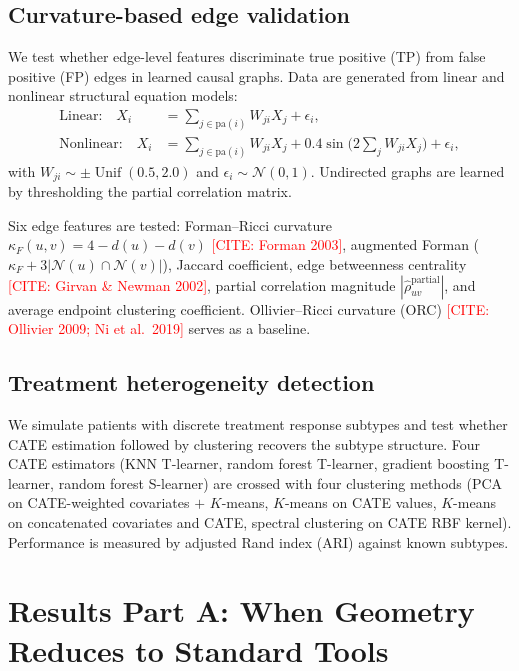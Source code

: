 \documentclass[11pt]{article}
\newcommand{\misscite}[1]{\textcolor{red}{[CITE: #1]}}
\begin{document}
\subsection{Curvature-based edge validation}
\label{sec:meth-curvature}

We test whether edge-level features discriminate true positive (TP) from false positive (FP) edges in learned causal graphs.
Data are generated from linear and nonlinear structural equation models:
\begin{align}
    \text{Linear:} \quad X_i &= \textstyle\sum_{j \in \mathrm{pa}(i)} W_{ji} X_j + \epsilon_i, \\
    \text{Nonlinear:} \quad X_i &= \textstyle\sum_{j \in \mathrm{pa}(i)} W_{ji} X_j + 0.4 \sin\!\bigl(2 \textstyle\sum_{j} W_{ji} X_j\bigr) + \epsilon_i,
\end{align}
with $W_{ji} \sim \pm\operatorname{Unif}(0.5, 2.0)$ and $\epsilon_i \sim \mathcal{N}(0, 1)$.
Undirected graphs are learned by thresholding the partial correlation matrix.

Six edge features are tested:
Forman--Ricci curvature $\kappa_F(u,v) = 4 - d(u) - d(v)$ \misscite{Forman 2003},
augmented Forman ($\kappa_F + 3|\mathcal{N}(u) \cap \mathcal{N}(v)|$),
Jaccard coefficient,
edge betweenness centrality \misscite{Girvan \& Newman 2002},
partial correlation magnitude $|\hat\rho^{\mathrm{partial}}_{uv}|$,
and average endpoint clustering coefficient.
Ollivier--Ricci curvature (ORC) \misscite{Ollivier 2009; Ni et al.\ 2019} serves as a baseline.

\subsection{Treatment heterogeneity detection}
\label{sec:meth-hte}

We simulate patients with discrete treatment response subtypes and test whether CATE estimation followed by clustering recovers the subtype structure.
Four CATE estimators (KNN T-learner, random forest T-learner, gradient boosting T-learner, random forest S-learner) are crossed with four clustering methods (PCA on CATE-weighted covariates $+$ $K$-means, $K$-means on CATE values, $K$-means on concatenated covariates and CATE, spectral clustering on CATE RBF kernel).
Performance is measured by adjusted Rand index (ARI) against known subtypes.

\section{Results Part A: When Geometry Reduces to Standard Tools}
\label{sec:results-A}
\end{document}
